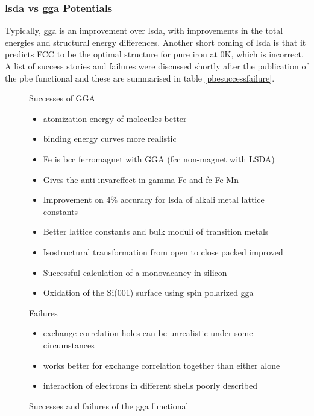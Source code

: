 \subsubsection{\acrshort{lsda} vs \acrshort{gga} Potentials}
\label{section:ggavslsda}

Typically, \acrshort{gga} is an improvement over \acrshort{lsda}, with improvements in the total energies and structural energy differences\cite{perdewggamadesimple}.  Another short coming of \acrshort{lsda} is that it predicts FCC to be the optimal structure for pure iron at 0K, which is incorrect\cite{perdewggabackwardforward}.  A list of success stories and failures were discussed shortly after the publication of the \acrshort{pbe} functional and these are summarised in table \ref{pbesuccessfailure}\cite{ldaggaperdew}.

\begin{figure}
\begin{minipage}[t]{.42\textwidth}
Successes of GGA
\begin{itemize}
\item atomization energy of molecules better
\item binding energy curves more realistic
\item Fe is bcc ferromagnet with GGA (fcc non-magnet with LSDA)
\item Gives the anti \gls{invareffect} in gamma-Fe and fc Fe-Mn 
\item Improvement on 4\% accuracy for \acrshort{lsda} of alkali metal lattice constants
\item Better lattice constants and bulk moduli of transition metals
\item Isostructural transformation from open to close packed improved
\item Successful calculation of a monovacancy in silicon
\item Oxidation of the Si(001) surface using spin polarized \acrshort{gga}
\end{itemize}
\end{minipage}
\begin{minipage}{.15\textwidth}
\end{minipage}
\begin{minipage}[t]{.42\textwidth}
Failures
\begin{itemize}
\item exchange-correlation holes can be unrealistic under some circumstances
\item works better for exchange correlation together than either alone
\item interaction of electrons in different shells poorly described
\end{itemize}
\end{minipage}
\caption{Successes and failures of the \acrshort{gga} functional\cite{ldaggaperdew}}
\label{fig:pbesuccessfailure}
\end{figure}

